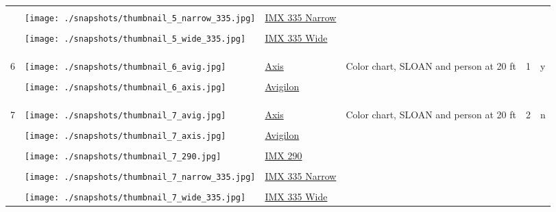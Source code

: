 \documentclass{article}%
\begin{document}
\begin{longtabu}{m{2.5cm} m{4cm} m{2cm} m{4cm} m{2cm} m{2cm}}
&&&&&\\%
&\texttt{[image: ./snapshots/thumbnail\_5\_narrow\_335.jpg]}&\href{https://drive.google.com/file/d/17hQ5NxbOW74IUgj1OgmchKRLJQevGJQN/view?usp=sharing}{IMX 335 Narrow}&&&\\%
&&&&&\\%
&\texttt{[image: ./snapshots/thumbnail\_5\_wide\_335.jpg]}&\href{https://drive.google.com/file/d/1O9Ss0SxVm-hpi9jvpoeF_SfwOqFfMg6_/view?usp=sharing}{IMX 335 Wide}&&&\\%
&&&&&\\%
&&&&&\\%
\hline%
&&&&&\\%
6&\texttt{[image: ./snapshots/thumbnail\_6\_avig.jpg]}&\href{https://drive.google.com/file/d/1o1POfDeMFYfWdqqpsCTkpXhpXzOnykpl/view?usp=sharing}{Axis}&Color chart, SLOAN and person at 20 ft&1&y\\%
&&&&&\\%
&\texttt{[image: ./snapshots/thumbnail\_6\_axis.jpg]}&\href{https://drive.google.com/file/d/1lN72wdxZQx5QDA945h6Qe6C2h65NqJke/view?usp=sharing}{Avigilon}&&&\\%
&&&&&\\%
&&&&&\\%
\hline%
&&&&&\\%
7&\texttt{[image: ./snapshots/thumbnail\_7\_avig.jpg]}&\href{https://drive.google.com/file/d/1y54j4DJ2NKJ16K7dxZhIk_P7y2XZhixC/view?usp=sharing}{Axis}&Color chart, SLOAN and person at 20 ft&2&n\\%
&&&&&\\%
&\texttt{[image: ./snapshots/thumbnail\_7\_axis.jpg]}&\href{https://drive.google.com/file/d/1aYQ1jCPiIFOqgx57GCxPA0ue1wR4so1H/view?usp=sharing}{Avigilon}&&&\\%
&&&&&\\%
&\texttt{[image: ./snapshots/thumbnail\_7\_290.jpg]}&\href{https://drive.google.com/file/d/12DgB9bq1eeSnzXY7FnWGNODZh0oyK-dp/view?usp=sharing}{IMX 290}&&&\\%
&&&&&\\%
&\texttt{[image: ./snapshots/thumbnail\_7\_narrow\_335.jpg]}&\href{https://drive.google.com/file/d/1jf2rYP0qS8I3DQF76z-EezgiqJ8959Wt/view?usp=sharing}{IMX 335 Narrow}&&&\\%
&&&&&\\%
&\texttt{[image: ./snapshots/thumbnail\_7\_wide\_335.jpg]}&\href{https://drive.google.com/file/d/1p6secTWYWgU3ddX4v2jcT9RK04pmodIf/view?usp=sharing}{IMX 335 Wide}&&&\\%

\end{longtabu}
\end{document}
